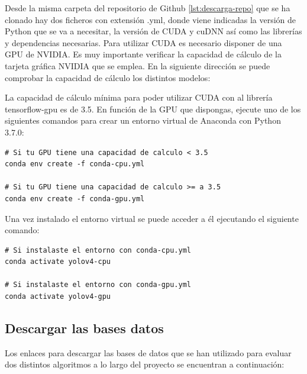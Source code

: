 Desde la misma carpeta del repositorio de Github \ref{lst:descarga-repo} que se ha clonado hay dos ficheros con extensión .yml, donde viene indicadas la versión de Python que se va a necesitar, la versión de CUDA y cuDNN así como las librerías y dependencias necesarias. Para utilizar CUDA es necesario disponer de una GPU de NVIDIA. Es muy importante verificar la capacidad de cálculo de la tarjeta gráfica NVIDIA que se emplea. En la siguiente dirección \cite{cuda-gpus} se puede comprobar la capacidad de cálculo los distintos modelos:

La capacidad de cálculo mínima para poder utilizar CUDA con al librería tensorflow-gpu es de 3.5. En función de la GPU que dispongas, ejecute uno de los siguientes comandos para crear un entorno virtual de Anaconda con Python 3.7.0:

\vspace{0.5cm}

\begin{lstlisting}[language=iPython,caption=Creación entorno virtual en Anaconda,captionpos=b,label={lst:crear-env}]
# Si tu GPU tiene una capacidad de calculo < 3.5
conda env create -f conda-cpu.yml

# Si tu GPU tiene una capacidad de calculo >= a 3.5
conda env create -f conda-gpu.yml
\end{lstlisting}

Una vez instalado el entorno virtual se puede acceder a él ejecutando el siguiente comando:

\vspace{0.5cm}

\begin{lstlisting}[language=iPython,caption=Activar entorno virtual de Anaconda,captionpos=b,label={lst:activar-env}]
# Si instalaste el entorno con conda-cpu.yml
conda activate yolov4-cpu

# Si instalaste el entorno con conda-gpu.yml
conda activate yolov4-gpu
\end{lstlisting}

\subsection{Descargar las bases datos}
\label{subsec:descarga-datasets}

Los enlaces para descargar las bases de datos que se han utilizado para evaluar dos distintos algoritmos a lo largo del proyecto se encuentran a continuación:

